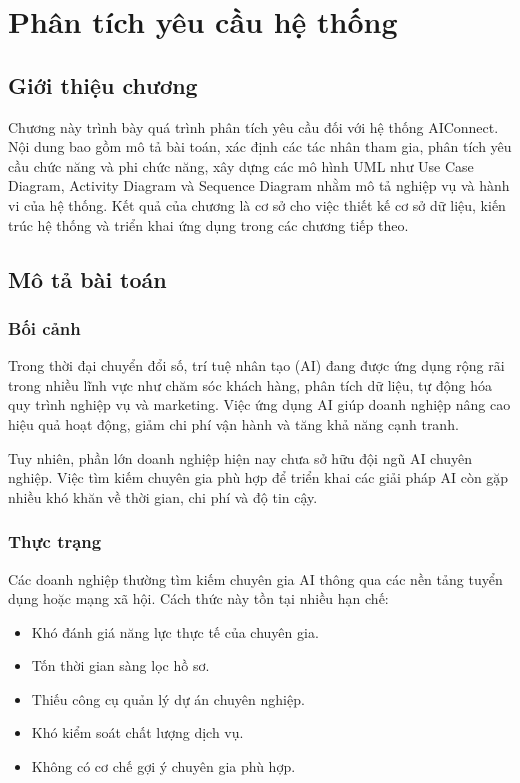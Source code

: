 \chapter{Phân tích yêu cầu hệ thống}

\section{Giới thiệu chương}

Chương này trình bày quá trình phân tích yêu cầu đối với hệ thống AIConnect. Nội dung bao gồm mô tả bài toán, xác định các tác nhân tham gia, phân tích yêu cầu chức năng và phi chức năng, xây dựng các mô hình UML như Use Case Diagram, Activity Diagram và Sequence Diagram nhằm mô tả nghiệp vụ và hành vi của hệ thống. Kết quả của chương là cơ sở cho việc thiết kế cơ sở dữ liệu, kiến trúc hệ thống và triển khai ứng dụng trong các chương tiếp theo.

\section{Mô tả bài toán}

\subsection{Bối cảnh}

Trong thời đại chuyển đổi số, trí tuệ nhân tạo (AI) đang được ứng dụng rộng rãi trong nhiều lĩnh vực như chăm sóc khách hàng, phân tích dữ liệu, tự động hóa quy trình nghiệp vụ và marketing. Việc ứng dụng AI giúp doanh nghiệp nâng cao hiệu quả hoạt động, giảm chi phí vận hành và tăng khả năng cạnh tranh.

Tuy nhiên, phần lớn doanh nghiệp hiện nay chưa sở hữu đội ngũ AI chuyên nghiệp. Việc tìm kiếm chuyên gia phù hợp để triển khai các giải pháp AI còn gặp nhiều khó khăn về thời gian, chi phí và độ tin cậy.

\subsection{Thực trạng}

Các doanh nghiệp thường tìm kiếm chuyên gia AI thông qua các nền tảng tuyển dụng hoặc mạng xã hội. Cách thức này tồn tại nhiều hạn chế:

\begin{itemize}
    \item Khó đánh giá năng lực thực tế của chuyên gia.
    \item Tốn thời gian sàng lọc hồ sơ.
    \item Thiếu công cụ quản lý dự án chuyên nghiệp.
    \item Khó kiểm soát chất lượng dịch vụ.
    \item Không có cơ chế gợi ý chuyên gia phù hợp.
\end{itemize}

